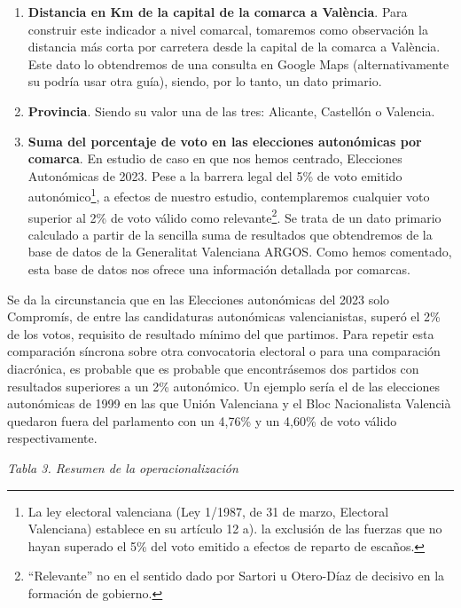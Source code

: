 \documentclass[
]{article}
\begin{document}
\begin{enumerate}
\def\labelenumi{\arabic{enumi}.}
\setcounter{enumi}{2}
\item
  \textbf{Distancia en Km de la capital de la comarca a València}. Para
  construir este indicador a nivel comarcal, tomaremos como observación
  la distancia más corta por carretera desde la capital de la comarca a
  València. Este dato lo obtendremos de una consulta en Google Maps
  (alternativamente su podría usar otra guía), siendo, por lo tanto, un
  dato primario.
\item
  \textbf{Provincia}. Siendo su valor una de las tres: Alicante,
  Castellón o Valencia.
\item
  \textbf{Suma del porcentaje de voto en las elecciones autonómicas por
  comarca}. En estudio de caso en que nos hemos centrado, Elecciones
  Autonómicas de 2023. Pese a la barrera legal del 5\% de voto emitido
  autonómico\footnote{La ley electoral valenciana (Ley 1/1987, de 31 de
    marzo, Electoral Valenciana) establece en su artículo 12 a). la
    exclusión de las fuerzas que no hayan superado el 5\% del voto
    emitido a efectos de reparto de escaños.}, a efectos de nuestro
  estudio, contemplaremos cualquier voto superior al 2\% de voto válido
  como relevante\footnote{``Relevante'' no en el sentido dado por
    Sartori u Otero-Díaz de decisivo en la formación de gobierno.}. Se
  trata de un dato primario calculado a partir de la sencilla suma de
  resultados que obtendremos de la base de datos de la Generalitat
  Valenciana ARGOS. Como hemos comentado, esta base de datos nos ofrece
  una información detallada por comarcas.
\end{enumerate}

Se da la circunstancia que en las Elecciones autonómicas del 2023 solo
Compromís, de entre las candidaturas autonómicas valencianistas, superó
el 2\% de los votos, requisito de resultado mínimo del que partimos.
Para repetir esta comparación síncrona sobre otra convocatoria electoral
o para una comparación diacrónica, es probable que es probable que
encontrásemos dos partidos con resultados superiores a un 2\%
autonómico. Un ejemplo sería el de las elecciones autonómicas de 1999 en
las que Unión Valenciana y el Bloc Nacionalista Valencià quedaron fuera
del parlamento con un 4,76\% y un 4,60\% de voto válido respectivamente.

\emph{Tabla 3. Resumen de la operacionalización}
\end{document}
